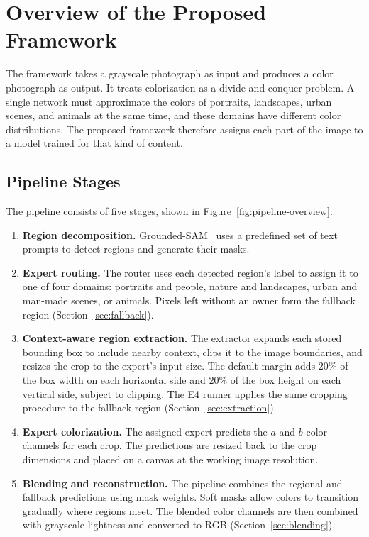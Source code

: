 \documentclass{FastFyp}
\begin{document}
\section{Overview of the Proposed Framework}
\label{sec:framework}
The framework takes a grayscale photograph as input and produces a color photograph as output. It treats colorization as a divide-and-conquer problem. A single network must approximate the colors of portraits, landscapes, urban scenes, and animals at the same time, and these domains have different color distributions. The proposed framework therefore assigns each part of the image to a model trained for that kind of content.
\subsection{Pipeline Stages}

The pipeline consists of five stages, shown in
Figure~\ref{fig:pipeline-overview}.

\begin{enumerate}
    \item \textbf{Region decomposition.} Grounded-SAM~\cite{ref17} uses a
          predefined set of text prompts to detect regions and generate
          their masks.

    \item \textbf{Expert routing.} The router uses each detected region's
          label to assign it to one of four domains: portraits and people,
          nature and landscapes, urban and man-made scenes, or animals.
          Pixels left without an owner form the fallback region
          (Section~\ref{sec:fallback}).

    \item \textbf{Context-aware region extraction.} The extractor expands
          each stored bounding box to include nearby context, clips it to
          the image boundaries, and resizes the crop to the expert's input
          size. The default margin adds $20\%$ of the box width on each
          horizontal side and $20\%$ of the box height on each vertical
          side, subject to clipping. The E4 runner applies the same
          cropping procedure to the fallback region
          (Section~\ref{sec:extraction}).

    \item \textbf{Expert colorization.} The assigned expert predicts the
          $a$ and $b$ color channels for each crop. The predictions are
          resized back to the crop dimensions and placed on a canvas at
          the working image resolution.

    \item \textbf{Blending and reconstruction.} The pipeline combines the
          regional and fallback predictions using mask weights. Soft
          masks allow colors to transition gradually where regions meet.
          The blended color channels are then combined with grayscale
          lightness and converted to RGB (Section~\ref{sec:blending}).
\end{enumerate}
\end{document}
